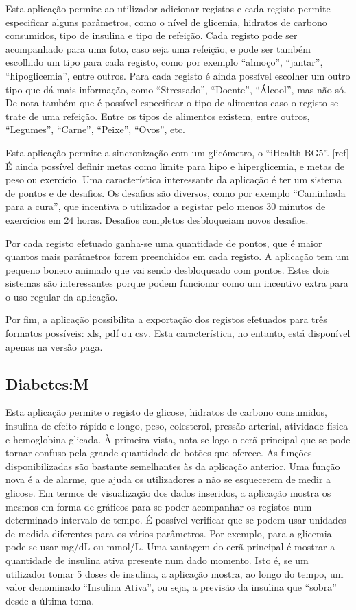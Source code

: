 Esta aplicação permite ao utilizador adicionar registos e cada registo permite especificar alguns parâmetros, como o nível de glicemia, hidratos de carbono consumidos, tipo de insulina e tipo de refeição. Cada registo pode ser acompanhado para uma foto, caso seja uma refeição, e pode ser também escolhido um tipo para cada registo, como por exemplo ``almoço'', ``jantar'', ``hipoglicemia'', entre outros. Para cada registo é ainda possível escolher um outro tipo que dá mais informação, como ``Stressado'', ``Doente'', ``Álcool'', mas não só. De nota também que é possível especificar o tipo de alimentos caso o registo se trate de uma refeição. Entre os tipos de alimentos existem, entre outros, ``Legumes'', ``Carne'', ``Peixe'', ``Ovos'', etc.

Esta aplicação permite a sincronização com um glicómetro, o ``iHealth BG5''. [ref] É ainda possível definir metas como limite para hipo e hiperglicemia, e metas de peso ou exercício. Uma característica interessante da aplicação é ter um sistema de pontos e de desafios. Os desafios são diversos, como por exemplo ``Caminhada para a cura'', que incentiva o utilizador a registar pelo menos 30 minutos de exercícios em 24 horas. Desafios completos desbloqueiam novos desafios. 

Por cada registo efetuado ganha-se uma quantidade de pontos, que é maior quantos mais parâmetros forem preenchidos em cada registo. A aplicação tem um pequeno boneco animado que vai sendo desbloqueado com pontos. Estes dois sistemas são interessantes porque podem funcionar como um incentivo extra para o uso regular da aplicação. 

Por fim, a aplicação possibilita a exportação dos registos efetuados para três formatos possíveis: xls, pdf ou csv. Esta característica, no entanto, está disponível apenas na versão paga.

\subsection{Diabetes:M}

Esta aplicação permite o registo de glicose, hidratos de carbono consumidos, insulina de efeito rápido e longo, peso, colesterol, pressão arterial, atividade física e hemoglobina glicada. À primeira vista, nota-se logo o ecrã principal que se pode tornar confuso pela grande quantidade de botões que oferece. As funções disponibilizadas são bastante semelhantes às da aplicação anterior. Uma função nova é a de alarme, que ajuda os utilizadores a não se esquecerem de medir a glicose. Em termos de visualização dos dados inseridos, a aplicação mostra os mesmos em forma de gráficos para se poder acompanhar os registos num determinado intervalo de tempo. É possível verificar que se podem usar unidades de medida diferentes para os vários parâmetros. Por exemplo, para a glicemia pode-se usar mg/dL ou mmol/L. Uma vantagem do ecrã principal é mostrar a quantidade de insulina ativa presente num dado momento. Isto é, se um utilizador tomar 5 doses de insulina, a aplicação mostra, ao longo do tempo, um valor denominado ``Insulina Ativa'', ou seja, a previsão da insulina que ``sobra'' desde a última toma.

